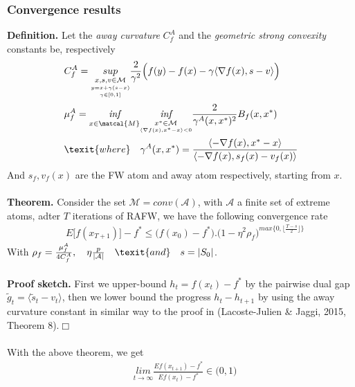 \documentclass{article}
\begin{document}
\subsubsection{Convergence results}
\textbf{Definition.} Let the \textit{away curvature} $C^{A}_{f}$ and the \textit{geometric strong convexity} constants be, respectively
\begin{equation*}
\begin{aligned}
    &C^{A}_{f}= \underset{\underset{\underset{\gamma\in[0,1]}{y=x+\gamma(s- x)}}{x,s,v\in\mathcal{M}}}{sup}\frac{2}{\gamma^{2}}\Big(f(y)- f(x)- \gamma\langle \nabla f(x), s- v\rangle\Big)\\
    &\mu^{A}_{f}= \underset{x\in\matcal{M}}{\textit{inf}}\underset{\underset{\langle\nabla f(x), x^{*}-x\rangle < 0}{x^{*}\in\mathcal{M}}}{\textit{inf}}\frac{2}{\gamma^{A}(x,x^{*})^{2}}B_{f}(x,x^{*})\\
    &\texit{where}\quad\gamma^{A}(x,x^{*})=\frac{\langle -\nabla f(x), x^{*}- x\rangle}{\langle -\nabla f(x), s_{f}(x)- v_{f}(x)\rangle}\\
\end{aligned}
\end{equation*}
And $s_{f}, v_{f}(x)$ are the FW atom and away atom respectively, starting from $x$.\\
\\
\textbf{Theorem.} Consider the set $\mathcal{M}=conv(\mathcal{A})$, with $\mathcal{A}$ a finite set of extreme atoms, adter $T$ iterations of RAFW, we have the following convergence rate
\begin{equation*}
\begin{aligned}
    &E\big[f(x_{T+1})\big]- f^{*}\leq \Big(f(x_{0})- f^{*}\Big).\Big(1- \eta^{2}\rho_{f}\Big)^{\textit{max}\{0,\lfloor\frac{T-s}{2}\rfloor\}}
\end{aligned}
\end{equation*}
With $\rho_{f}= \frac{\mu^{A}_{f}}{4C^{A}_{f}},\quad\eta\frac{p}{|\mathcal{A}|}\quad\texit{and}\quad s=|S_{0}|$.\\
\\
\textbf{Proof sketch.} First we upper-bound $h_{t}=f(x_{t})- f^{*}$ by the pairwise dual gap $\tilde{g}_{t}=\langle \tilde{s}_{t}- v_{t}\rangle$, then we lower bound the progress $h_{t}- h_{t+1}$ by using the away curvature constant in similar way to the proof in (Lacoste-Julien & Jaggi, 2015, Theorem 8).$\Box$\\
\\
With the above theorem, we get 
\begin{equation*}
\begin{aligned}
    &\underset{t\rightarrow \infty}{\textit{lim}} \frac{E f(x_{t+1})- f^{*}}{E f(x_{t})- f^{*}} \in \big(0,1\big)
\end{aligned}
\end{equation*}
\end{document}
